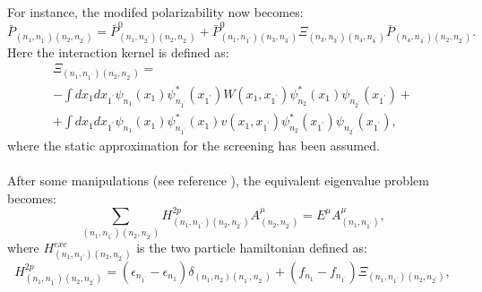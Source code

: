 \documentclass[11pt]{article}
\begin{document}
For instance, the modifed polarizability now becomes:
\begin{equation}
\bar{P}_{(n_{1},n_{1^{\prime}})(n_{2},n_{2^{\prime}})} = \bar{P}^{0}_{(n_{1},n_{2^{\prime}})(n_{2},n_{2^{\prime}})} + \bar{P}^{0}_{(n_{1},n_{1^{\prime}})(n_{3},n_{3^{\prime}})}\Xi_{(n_{3},n_{3^{\prime}})(n_{4},n_{4^{\prime}})}\bar{P}_{(n_{4},n_{4^{\prime}})(n_{2},n_{2^{\prime}})}.
\end{equation}
Here the interaction kernel is defined as:
\begin{multline}
\Xi_{(n_{1},n_{1^{\prime}})(n_{2},n_{2^{\prime}})} = \\
- \int dx_{1}dx_{1^{\prime}} \psi_{n_{1}}(x_{1})\psi^{*}_{n_{1^{\prime}}}(x_{1^{\prime}}) W(x_{1},x_{1^{\prime}})\psi^{*}_{n_{2}}(x_{1})\psi_{n_{2^{\prime}}}(x_{1^{\prime}}) + \\
+ \int dx_{1}dx_{1^{\prime}}\psi_{n_{1}}(x_{1})\psi^{*}_{n_{1^{\prime}}}(x_{1}) v(x_{1},x_{1^{\prime}})\psi^{*}_{n_{2}}(x_{1^{\prime}})\psi_{n_{2^{\prime}}}(x_{1^{\prime}}),
\end{multline}
where the static approximation for the screening has been assumed. 
\\
\\
After some manipulations (see reference \cite{onid+02rmp}), the equivalent eigenvalue problem becomes: 
\begin{equation}\label{h2peigprob}
\sum_{(n_{1},n_{1^{\prime}})(n_{2},n_{2^{\prime}})}H^{2p}_{(n_{1},n_{1^{\prime}})(n_{2},n_{2^{\prime}})}A^{\mu}_{(n_{2},n_{2^{\prime}})} = E^{\mu} A^{\mu}_{(n_{1},n_{1^{\prime}})},
\end{equation}
where $H^{exc}_{(n_{1},n_{1^{\prime}})(n_{2},n_{2^{\prime}})}$ is the two particle hamiltonian defined as:
\begin{equation}
H^{2p}_{(n_{1},n_{1^{\prime}})(n_{2},n_{2^{\prime}})} = (\epsilon_{n_{1^{\prime}}} - \epsilon_{n_{1}})\delta_{(n_{1},n_{2})(n_{1^{\prime}},n_{2^
{\prime}})} +  (f_{n_{1}} - f_{n_{1^{\prime}}})\Xi_{(n_{1},n_{1^{\prime}})(n_{2},n_{2^{\prime}})},
\end{equation}
\end{document}
